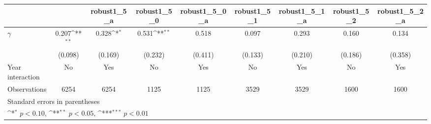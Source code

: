 {
\def\sym#1{\ifmmode^{#1}\else\(^{#1}\)\fi}
\begin{tabular}{l*{8}{c}}
\toprule
                &\multicolumn{1}{c}{}&\multicolumn{1}{c}{robust1\_5\_a}&\multicolumn{1}{c}{robust1\_5\_0}&\multicolumn{1}{c}{robust1\_5\_0\_a}&\multicolumn{1}{c}{robust1\_5\_1}&\multicolumn{1}{c}{robust1\_5\_1\_a}&\multicolumn{1}{c}{robust1\_5\_2}&\multicolumn{1}{c}{robust1\_5\_2\_a}\\
\midrule
$\gamma$        &    0.207\sym{**} &    0.328\sym{*}  &    0.531\sym{**} &    0.518         &    0.097         &    0.293         &    0.160         &    0.134         \\
                &  (0.098)         &  (0.169)         &  (0.232)         &  (0.411)         &  (0.133)         &  (0.210)         &  (0.186)         &  (0.358)         \\
\addlinespace
Year interaction &       No         &      Yes         &       No         &      Yes         &       No         &      Yes         &       No         &      Yes         \\
\midrule
Observations    &     6254         &     6254         &     1125         &     1125         &     3529         &     3529         &     1600         &     1600         \\
\bottomrule
\multicolumn{9}{l}{\footnotesize Standard errors in parentheses}\\
\multicolumn{9}{l}{\footnotesize \sym{*} \(p<0.10\), \sym{**} \(p<0.05\), \sym{***} \(p<0.01\)}\\
\end{tabular}
}
